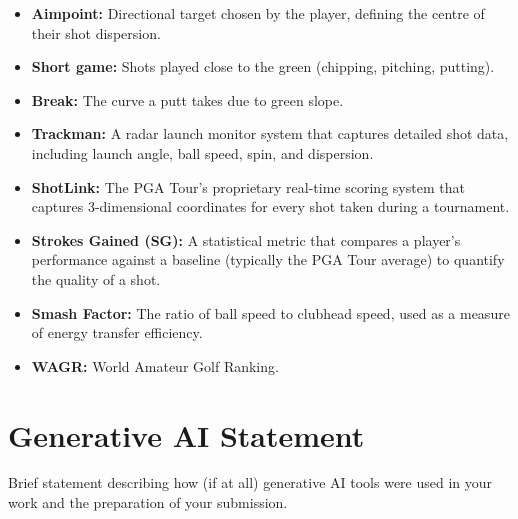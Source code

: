 \documentclass[11pt, letterpaper]{article}
\begin{document}
\begin{itemize}
    \item \textbf{Aimpoint:} Directional target chosen by the player, defining the centre of their shot dispersion.
    \item \textbf{Short game:} Shots played close to the green (chipping, pitching, putting).
    \item \textbf{Break:} The curve a putt takes due to green slope.
    \item \textbf{Trackman:} A radar launch monitor system that captures detailed shot data, including launch angle, ball speed, spin, and dispersion.
    \item \textbf{ShotLink:} The PGA Tour's proprietary real-time scoring system that captures 3-dimensional coordinates for every shot taken during a tournament.
    \item \textbf{Strokes Gained (SG):} A statistical metric that compares a player's performance against a baseline (typically the PGA Tour average) to quantify the quality of a shot.
    \item \textbf{Smash Factor:} The ratio of ball speed to clubhead speed, used as a measure of energy transfer efficiency.
    \item \textbf{WAGR:} World Amateur Golf Ranking.
\end{itemize}











\newpage 



\printbibliography[title={References}]

\vspace{2cm}


\section*{Generative AI Statement}
\noindent
Brief statement describing how (if at all) generative AI tools were used in your work and the preparation of your submission.
\end{document}
